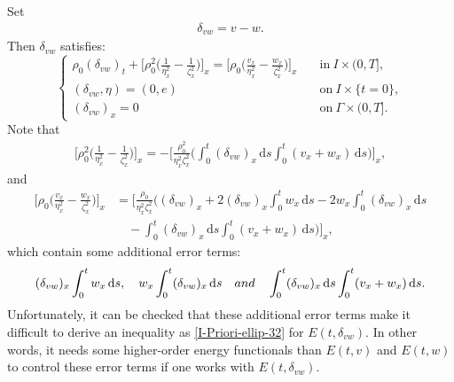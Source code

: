 \documentclass[11pt, reqno]{amsart}
\newcommand{\diff}{\mathrm{d}}
\numberwithin{equation}{section}
\begin{document}
{Set
\begin{equation*}
	\begin{aligned}
		\delta_{vw}=v-w.
	\end{aligned}
\end{equation*}
Then \(\delta_{vw}\) satisfies:
\begin{equation*}
	\begin{cases}
		\rho_0(\delta_{vw})_t+\big[\rho_0^2\big(\frac{1}{\eta_x^2}
		-\frac{1}{\zeta_x^2}\big)\big]_x
		=\big[\rho_0\big(\frac{v_x}{\eta_x^2}-\frac{w_x}{\zeta_x^2}\big)\big]_x&\quad \mbox{in}\ I\times (0,T],\\
		(\delta_{vw},\eta)=(0,e) &\quad \mbox{on}\ I\times \{t=0\},\\
		(\delta_{vw})_x=0 &\quad \mbox{on}\ \Gamma\times (0,T].
	\end{cases}
\end{equation*}
Note that
\begin{equation*}
	\begin{aligned}
		\bigg[\rho_0^2\bigg(\frac{1}{\eta_x^2}-\frac{1}{\zeta_x^2}\bigg)\bigg]_x
		=-\bigg[\frac{\rho_0^2}{\eta_x^2\zeta_x^2}
		\bigg(\int_0^t(\delta_{vw})_x\,\diff s\int_0^t(v_x+w_x)\,\diff s\bigg)\bigg]_x,
	\end{aligned}
\end{equation*}
and
\begin{equation*}
	\begin{aligned}
		\bigg[\rho_0\bigg(\frac{v_x}{\eta_x^2}-\frac{w_x}{\zeta_x^2}\bigg)\bigg]_x
		&=\bigg[\frac{\rho_0}{\eta_x^2\zeta_x^2}
		\bigg((\delta_{vw})_x+2(\delta_{vw})_x\int_0^tw_x\,\diff s
		-2w_x\int_0^t(\delta_{vw})_x\,\diff s\\
		&\quad
		-\int_0^t(\delta_{vw})_x\,\diff s\int_0^t(v_x+w_x)\,\diff s\bigg)\bigg]_x,
	\end{aligned}
\end{equation*}
which contain some additional error terms:
\begin{equation*}
	\begin{aligned}
(\delta_{vw})_x\int_0^tw_x\,\diff s,\quad w_x\int_0^t(\delta_{vw})_x\,\diff s\quad {\rm{and}}\quad \int_0^t(\delta_{vw})_x\,\diff s\int_0^t(v_x+w_x)\,\diff s.
	\end{aligned}
\end{equation*}
Unfortunately, it can be checked that these additional error terms make it difficult to derive an inequality as \eqref{I-Priori-ellip-32} for 
\(E(t,\delta_{vw})\). In other words, it needs some higher-order energy functionals than \(E(t,v)\) and \(E(t,w)\) to control these error terms if one works with \(E(t,\delta_{vw})\).


}
\end{document}
